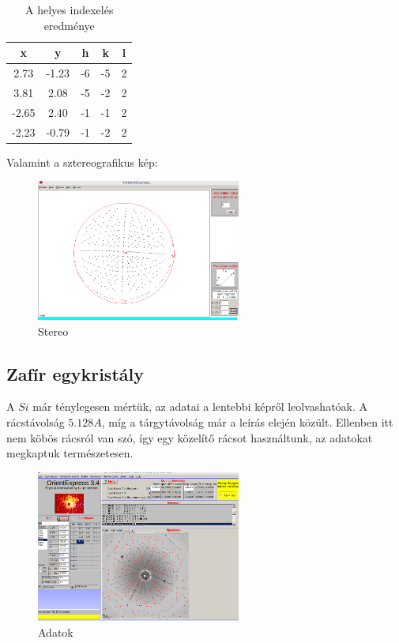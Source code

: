 \documentclass[a4paper,12pt]{article}
\begin{document}
\begin{table}[H]
	\centering
	\begin{tabular}{|c|c||c|c|c|}  \hline
		x     & y     & h  & k  & l  \\ \hline
		2.73 & -1.23 & -6 & -5 & 2 \\ \hline
		3.81  & 2.08  & -5  & -2 & 2  \\ \hline
		-2.65 & 2.40  & -1  & -1 & 2 \\ \hline
		-2.23 & -0.79 & -1 & -2 & 2  \\ \hline
	\end{tabular}
	\caption{A helyes indexelés eredménye}
\end{table}

\par Valamint a sztereografikus kép:

\begin{figure}[H]
	\centering
	\includegraphics[width=0.6\textwidth]{./valid_indexation/Si-stereo.png}
	\caption{Stereo}
\end{figure}

\subsection{ Zafír egykristály}

\par A $Si$ már ténylegesen mértük, az adatai a lentebbi képről
leolvashatóak. A rácstávolság $5.128 A$, míg a tárgytávolság már a leírás
elején közült. Ellenben itt nem köbös rácsról van szó, így egy közelítő
rácsot használtunk, az adatokat megkaptuk természetesen.

\begin{figure}[H]
	\centering
	\includegraphics[width=0.6\textwidth]{./valid_indexation/Zafir.png}
	\caption{Adatok}
\end{figure}
\end{document}
